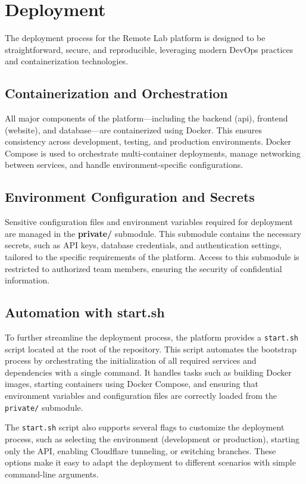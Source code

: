 \section{Deployment}

The deployment process for the Remote Lab platform is designed to be straightforward, secure, and reproducible, leveraging modern DevOps practices and containerization technologies.

\subsection*{Containerization and Orchestration}
All major components of the platform—including the backend (api), frontend (website), and database—are containerized using Docker. This ensures consistency across development, testing, and production environments. Docker Compose is used to orchestrate multi-container deployments, manage networking between services, and handle environment-specific configurations.

\subsection*{Environment Configuration and Secrets}
Sensitive configuration files and environment variables required for deployment are managed in the \textbf{private/} submodule. This submodule contains the necessary secrets, such as API keys, database credentials, and authentication settings, tailored to the specific requirements of the platform. Access to this submodule is restricted to authorized team members, ensuring the security of confidential information.

\subsection*{Automation with start.sh}

To further streamline the deployment process, the platform provides a \texttt{start.sh} script located at the root of the repository. This script automates the bootstrap process by orchestrating the initialization of all required services and dependencies with a single command. It handles tasks such as building Docker images, starting containers using Docker Compose, and ensuring that environment variables and configuration files are correctly loaded from the \texttt{private/} submodule.

The \texttt{start.sh} script also supports several flags to customize the deployment process, such as selecting the environment (development or production), starting only the API, enabling Cloudflare tunneling, or switching branches. These options make it easy to adapt the deployment to different scenarios with simple command-line arguments.

